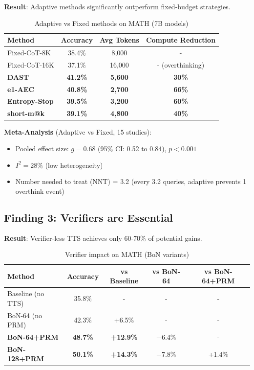 \documentclass[10pt,preprint]{neurips_2024}
\begin{document}
\textbf{Result}: Adaptive methods significantly outperform fixed-budget strategies.

\begin{table}[h]
\centering
\begin{tabular}{lccc}
\toprule
Method & Accuracy & Avg Tokens & Compute Reduction \\
\midrule
Fixed-CoT-8K & 38.4\% & 8,000 & - \\
Fixed-CoT-16K & 37.1\% & 16,000 & - (overthinking) \\
\textbf{DAST} & \textbf{41.2\%} & \textbf{5,600} & \textbf{30\%} \\
\textbf{e1-AEC} & \textbf{40.8\%} & \textbf{2,700} & \textbf{66\%} \\
\textbf{Entropy-Stop} & \textbf{39.5\%} & \textbf{3,200} & \textbf{60\%} \\
\textbf{short-m@k} & \textbf{39.1\%} & \textbf{4,800} & \textbf{40\%} \\
\bottomrule
\end{tabular}
\caption{Adaptive vs Fixed methods on MATH (7B models)}
\end{table}

\textbf{Meta-Analysis} (Adaptive vs Fixed, 15 studies):
\begin{itemize}
    \item Pooled effect size: $g = 0.68$ (95\% CI: 0.52 to 0.84), $p < 0.001$
    \item $I^2 = 28\%$ (low heterogeneity)
    \item Number needed to treat (NNT) = 3.2 (every 3.2 queries, adaptive prevents 1 overthink event)
\end{itemize}

\subsection{Finding 3: Verifiers are Essential}

\textbf{Result}: Verifier-less TTS achieves only 60-70\% of potential gains.

\begin{table}[h]
\centering
\begin{tabular}{lcccc}
\toprule
Method & Accuracy & vs Baseline & vs BoN-64 & vs BoN-64+PRM \\
\midrule
Baseline (no TTS) & 35.8\% & - & - & - \\
BoN-64 (no PRM) & 42.3\% & +6.5\% & - & - \\
\textbf{BoN-64+PRM} & \textbf{48.7\%} & \textbf{+12.9\%} & +6.4\% & - \\
\textbf{BoN-128+PRM} & \textbf{50.1\%} & \textbf{+14.3\%} & +7.8\% & +1.4\% \\
\bottomrule
\end{tabular}
\caption{Verifier impact on MATH (BoN variants)}
\end{table}
\end{document}
